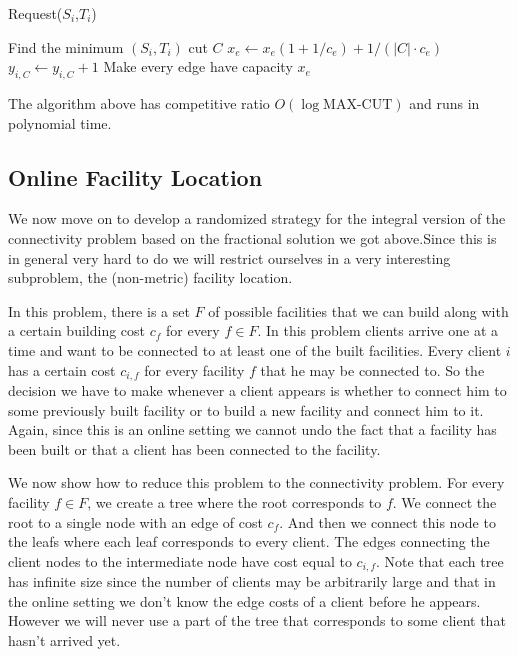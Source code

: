 \begin{algorithm}
\caption{Request($S_i$,$T_i$)}
\begin{algorithmic}[1]
  \STATE Find the minimum  $(S_i,T_i)$ cut $C$
    \STATE $x_e \leftarrow x_e (1 + 1/c_e) + 1/(|C| \cdot c_e)$ 
  \ENDFOR
  \STATE $y_{i,C} \leftarrow y_{i,C} + 1$
\ENDWHILE
\STATE Make every edge have capacity $x_e$ 
\end{algorithmic}
\end{algorithm}

The algorithm above has competitive ratio $O( \log \textrm{MAX-CUT} )$ and runs in polynomial time.

\subsection{Online Facility Location}
We now move on to develop a randomized strategy for the integral version of the connectivity problem based on the fractional solution we got above.Since this is in general very hard to do we will restrict ourselves in a very interesting subproblem, the (non-metric) facility location.

In this problem, there is a set $F$ of possible facilities that we can build along with a certain building cost $c_f$ for every $f \in F$. In this problem clients arrive one at a time and want to be connected to at least one of the built facilities. Every client $i$ has a certain cost $c_{i,f}$ for every facility $f$ that he may be connected to. So the decision we have to make whenever a client appears is whether to connect him to some previously built facility or to build a new facility and connect him to it. Again, since this is an online setting we cannot undo the fact that a facility has been built or that a client has been connected to the facility.

We now show how to reduce this problem to the connectivity problem. For every facility $f \in F$, we create a tree where the root corresponds to $f$. We connect the root to a single node with an edge of cost $c_f$. And then we connect this node to the leafs where each leaf corresponds to every client. The edges connecting the client nodes to the intermediate node have cost equal to $c_{i,f}$. Note that each tree has infinite size since the number of clients may be arbitrarily large and that in the online setting we don't know the edge costs of a client before he appears. However we will never use a part of the tree that corresponds to some client that hasn't arrived yet.

